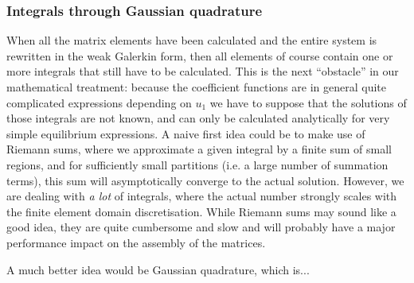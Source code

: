 \subsubsection{Integrals through Gaussian quadrature}
When all the matrix elements have been calculated and the entire system is rewritten in the weak Galerkin form, then all elements of course contain one or more integrals that still have to be calculated. This is the next ``obstacle'' in our mathematical treatment: because the coefficient functions are in general quite complicated expressions depending on $u_1$ we have to suppose that the solutions of those integrals are not known, and can only be calculated analytically for very simple equilibrium expressions. A naive first idea could be to make use of Riemann sums, where we approximate a given integral by a finite sum of small regions, and for sufficiently small partitions (i.e. a large number of summation terms), this sum will asymptotically converge to the actual solution. However, we are dealing with \emph{a lot} of integrals, where the actual number strongly scales with the finite element domain discretisation. While Riemann sums may sound like a good idea, they are quite cumbersome and slow and will probably have a major performance impact on the assembly of the matrices.

A much better idea would be Gaussian quadrature, which is...









\cleardoublepage
